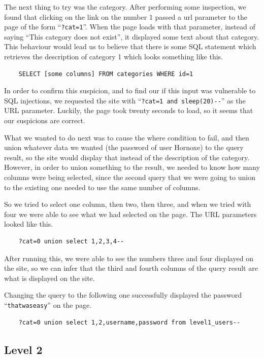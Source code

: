 \documentclass{article}
\begin{document}
The next thing to try was the category. After performing some inspection, we found that clicking on the link on the number 1 passed a url parameter to the page of the form ``\verb`?cat=1`''. When the page loads with that parameter, instead of saying ``This category does not exist'', it displayed some text about that category. This behaviour would lead us to believe that there is some SQL statement which retrieves the description of category 1 which looks something like this.

\begin{verbatim}
	SELECT [some columns] FROM categories WHERE id=1
\end{verbatim}

In order to confirm this suspicion, and to find our if this input was vulnerable to SQL injections, we requested the site with ``\verb`?cat=1 and sleep(20)--`'' as the URL parameter. Luckily, the page took twenty seconds to load, so it seems that our suspicions are correct.

What we wanted to do next was to cause the where condition to fail, and then union whatever data we wanted (the password of user Hornoxe) to the query result, so the site would display that instead of the description of the category. However, in order to union something to the result, we needed to know how many columns were being selected, since the second query that we were going to union to the existing one needed to use the same number of columns.

So we tried to select one column, then two, then three, and when we tried with four we were able to see what we had selected on the page. The URL parameters looked like this.

\begin{verbatim}
	?cat=0 union select 1,2,3,4--
\end{verbatim}

After running this, we were able to see the numbers three and four displayed on the site, so we can infer that the third and fourth columns of the query result are what is displayed on the site.

Changing the query to the following one successfully displayed the password ``\verb`thatwaseasy`'' on the page.

\begin{verbatim}
	?cat=0 union select 1,2,username,password from level1_users--
\end{verbatim}

\subsection{Level 2}
\end{document}
